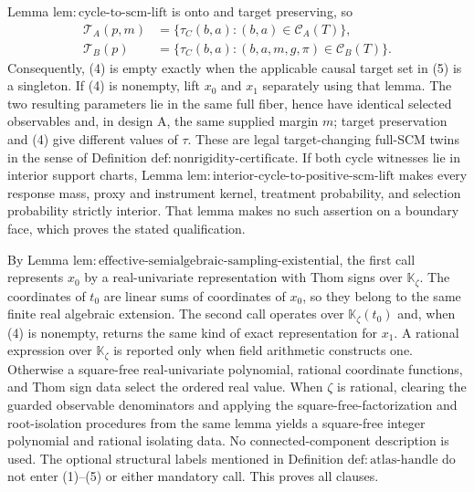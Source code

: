 Lemma \(\mathrm{lem{:}cycle\text{-}to\text{-}scm\text{-}lift}\) is onto and target preserving, so
\[
 \begin{aligned}
 \mathcal T_A(p,m)
  &=\{\tau_C(b,a):(b,a)\in\mathcal C_A(T)\},\\
 \mathcal T_B(p)
  &=\{\tau_C(b,a):(b,a,m,g,\pi)\in\mathcal C_B(T)\}.
 \end{aligned}                                             \tag{5}
\]
Consequently, (4) is empty exactly when the applicable causal target set in (5) is a singleton.  If (4) is nonempty, lift \(x_0\) and \(x_1\) separately using that lemma.  The two resulting parameters lie in the same full fiber, hence have identical selected observables and, in design A, the same supplied margin \(m\); target preservation and (4) give different values of \(\tau\).  These are legal target-changing full-SCM twins in the sense of Definition \(\mathrm{def{:}nonrigidity\text{-}certificate}\).  If both cycle witnesses lie in interior support charts, Lemma \(\mathrm{lem{:}interior\text{-}cycle\text{-}to\text{-}positive\text{-}scm\text{-}lift}\) makes every response mass, proxy and instrument kernel, treatment probability, and selection probability strictly interior.  That lemma makes no such assertion on a boundary face, which proves the stated qualification.

By Lemma \(\mathrm{lem{:}effective\text{-}semialgebraic\text{-}sampling\text{-}existential}\), the first call represents \(x_0\) by a real-univariate representation with Thom signs over \(\mathbb K_{\zeta}\).  The coordinates of \(t_0\) are linear sums of coordinates of \(x_0\), so they belong to the same finite real algebraic extension.  The second call operates over \(\mathbb K_{\zeta}(t_0)\) and, when (4) is nonempty, returns the same kind of exact representation for \(x_1\).  A rational expression over \(\mathbb K_{\zeta}\) is reported only when field arithmetic constructs one.  Otherwise a square-free real-univariate polynomial, rational coordinate functions, and Thom sign data select the ordered real value.  When \(\zeta\) is rational, clearing the guarded observable denominators and applying the square-free-factorization and root-isolation procedures from the same lemma yields a square-free integer polynomial and rational isolating data.  No connected-component description is used.  The optional structural labels mentioned in Definition \(\mathrm{def{:}atlas\text{-}handle}\) do not enter (1)--(5) or either mandatory call.  This proves all clauses.

